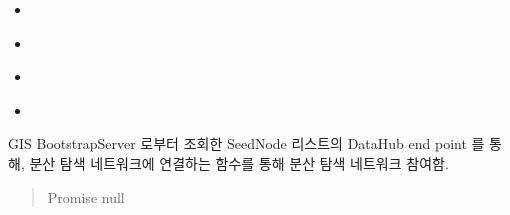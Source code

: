 \documentclass[a4paper,10pt,english]{sphinxmanual}
\begin{document}
\begin{fulllineitems}
\begin{fulllineitems}
\nopagebreak

\begin{itemize}
\item {} 
\sphinxAtStartPar
{\hyperref[\detokenize{_DHDaemon:DHDaemon._dhSearchUpdateInterestTopic}]{}}

\item {} 
\sphinxAtStartPar
{\hyperref[\detokenize{_DHSearch:DHSearch._deleteMyInfoFromKademlia}]{}}

\item {} 
\sphinxAtStartPar
{\hyperref[\detokenize{_DHSearch:DHSearch._updateInterestInfo}]{}}

\item {} 
\sphinxAtStartPar
{\hyperref[\detokenize{_kademlia:KNode.delete}]{}}

\end{itemize}



\end{fulllineitems}


\begin{fulllineitems}
\label{\detokenize{_DHSearch:DHSearch._discoverProcess}}
\pysigstartsignatures
{}
\pysigstopsignatures
\sphinxAtStartPar
GIS BootstrapServer 로부터 조회한 SeedNode 리스트의 DataHub end point 를 통해,
분산 탐색 네트워크에 연결하는 {\hyperref[\detokenize{_kademlia:kademlia}]{}}  함수를 통해 분산 탐색 네트워크 참여함.
\begin{quote}\begin{description}
\sphinxAtStartPar
Promise \sphinxhyphen{} null

\end{description}\end{quote}


\nopagebreak


\end{fulllineitems}
\end{fulllineitems}
\end{document}
